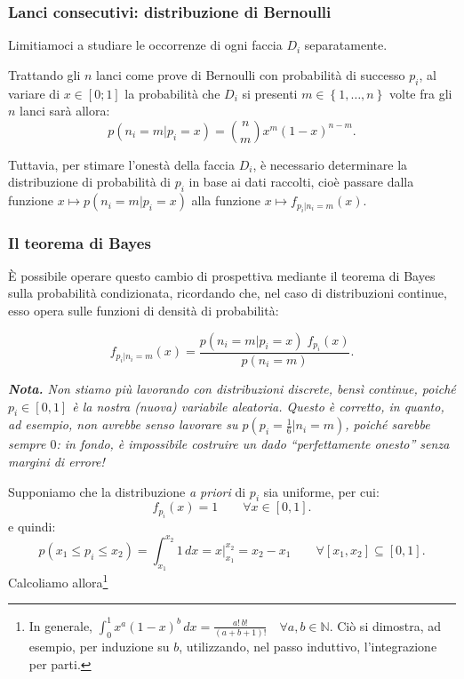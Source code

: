 \documentclass{article}
\begin{document}
\begin{appendices}
\subsubsection{Lanci consecutivi: distribuzione di Bernoulli}

Limitiamoci a studiare le occorrenze di ogni faccia $D_i$ separatamente.

Trattando gli $n$ lanci come prove di Bernoulli con probabilità di successo $p_i$, al variare di
$x\in\left[0;1\right]$ la probabilità che $D_i$ si presenti
$m\in\left\{1,\dots,n\right\}$ volte fra gli $n$ lanci sarà allora:
\[p(n_i=m|p_i=x) = \binom{n}{m} x^m (1-x)^{n - m}.\]

Tuttavia, per stimare l'onestà della faccia $D_i$, è necessario determinare la distribuzione di
probabilità di $p_i$ in base ai dati raccolti, cioè passare dalla funzione
$x\longmapsto p(n_i=m|p_i=x)$ alla funzione $x\longmapsto f_{p_i|n_i=m}(x)$.

\subsubsection{Il teorema di Bayes}
È possibile operare questo cambio di prospettiva mediante il teorema di Bayes sulla probabilità
condizionata, ricordando che, nel caso di distribuzioni continue, esso opera sulle funzioni di
densità di probabilità:

\[f_{p_i|n_i=m}(x) = \frac{p(n_i=m|p_i=x)\;f_{p_i}(x)}{p(n_i=m)}.\]

\emph{
    \textbf{Nota.} Non stiamo più lavorando con distribuzioni discrete, bensì continue,
    poiché $p_i \in \left[0,1\right]$ è la nostra (nuova) variabile aleatoria.
    Questo è corretto, in quanto, ad esempio, non avrebbe senso lavorare su
    $p(p_i = \frac{1}{6}|n_i=m)$, poiché sarebbe sempre $0$: in fondo, è impossibile
    costruire un dado “perfettamente onesto” senza margini di errore!
}

Supponiamo che la distribuzione \emph{a priori} di $p_i$ sia uniforme, per cui:
\[f_{p_i}(x) = 1\qquad\forall x\in \left[0,1\right].\]
e quindi:
\[p(x_1\le p_i\le x_2) = \int_{x_1}^{x_2}1\,dx = x\Big|_{x_1}^{x_2}=x_2-x_1
\qquad\forall \left[x_1,x_2\right]\subseteq \left[0,1\right].\]
Calcoliamo allora\footnote{
In generale, $\int_{0}^{1}x^a(1-x)^b\,dx = \frac{a!\,b!}{(a+b+1)!}\quad\forall a,b\in\mathbb{N}$.
Ciò si dimostra, ad esempio, per induzione su $b$, utilizzando, nel passo induttivo, l'integrazione
per parti.

}
\end{appendices}
\end{document}
